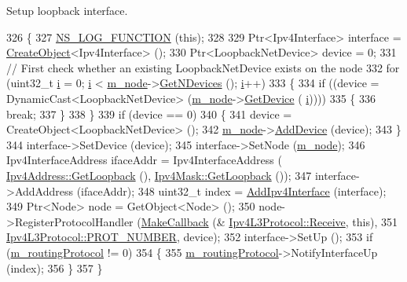 Setup loopback interface. 


\begin{DoxyCode}
326 \{
327   \hyperlink{log-macros-disabled_8h_a90b90d5bad1f39cb1b64923ea94c0761}{NS\_LOG\_FUNCTION} (\textcolor{keyword}{this});
328 
329   Ptr<Ipv4Interface> \textcolor{keyword}{interface }= \hyperlink{group__object_gad1d36559be10afa72c3656fd8598c1e2}{CreateObject}<Ipv4Interface> ();
330   Ptr<LoopbackNetDevice> device = 0;
331   \textcolor{comment}{// First check whether an existing LoopbackNetDevice exists on the node}
332   \textcolor{keywordflow}{for} (uint32\_t \hyperlink{bernuolliDistribution_8m_a6f6ccfcf58b31cb6412107d9d5281426}{i} = 0; \hyperlink{bernuolliDistribution_8m_a6f6ccfcf58b31cb6412107d9d5281426}{i} < \hyperlink{classns3_1_1Ipv4L3Protocol_ad2cc5076c247724f1e99b398edc1965a}{m\_node}->\hyperlink{classns3_1_1Node_a531554d2241ba4fa1cd74e3360be6bce}{GetNDevices} (); \hyperlink{bernuolliDistribution_8m_a6f6ccfcf58b31cb6412107d9d5281426}{i}++)
333     \{
334       \textcolor{keywordflow}{if} ((device = DynamicCast<LoopbackNetDevice> (\hyperlink{classns3_1_1Ipv4L3Protocol_ad2cc5076c247724f1e99b398edc1965a}{m\_node}->\hyperlink{classns3_1_1Node_a5918dfd24ef632efc9a83a5f6561c76e}{GetDevice} (
      \hyperlink{bernuolliDistribution_8m_a6f6ccfcf58b31cb6412107d9d5281426}{i}))))
335         \{
336           \textcolor{keywordflow}{break};
337         \}
338     \}
339   \textcolor{keywordflow}{if} (device == 0)
340     \{
341       device = CreateObject<LoopbackNetDevice> (); 
342       \hyperlink{classns3_1_1Ipv4L3Protocol_ad2cc5076c247724f1e99b398edc1965a}{m\_node}->\hyperlink{classns3_1_1Node_a42ff83ee1d5d1649c770d3f5b62375de}{AddDevice} (device);
343     \}
344   interface->SetDevice (device);
345   interface->SetNode (\hyperlink{classns3_1_1Ipv4L3Protocol_ad2cc5076c247724f1e99b398edc1965a}{m\_node});
346   Ipv4InterfaceAddress ifaceAddr = Ipv4InterfaceAddress (
      \hyperlink{classns3_1_1Ipv4Address_a583a93499e0d947439794d7bd0c6366d}{Ipv4Address::GetLoopback} (), \hyperlink{classns3_1_1Ipv4Mask_a7842be570f11b3ffcf3a50b0639bcf2d}{Ipv4Mask::GetLoopback} ());
347   interface->AddAddress (ifaceAddr);
348   uint32\_t index = \hyperlink{classns3_1_1Ipv4L3Protocol_afd3f97720c2d1af22f05038fcdb6e089}{AddIpv4Interface} (interface);
349   Ptr<Node> node = GetObject<Node> ();
350   node->RegisterProtocolHandler (\hyperlink{group__makecallbackmemptr_ga9376283685aa99d204048d6a4b7610a4}{MakeCallback} (&
      \hyperlink{classns3_1_1Ipv4L3Protocol_a2f27fb0a3f698ffb34a654323b063c94}{Ipv4L3Protocol::Receive}, \textcolor{keyword}{this}), 
351                                  \hyperlink{classns3_1_1Ipv4L3Protocol_a0146bc84815b7b73adb9c62cdafc9442}{Ipv4L3Protocol::PROT\_NUMBER}, device);
352   interface->SetUp ();
353   \textcolor{keywordflow}{if} (\hyperlink{classns3_1_1Ipv4L3Protocol_abc52052cbf9c4104be407221397c7a55}{m\_routingProtocol} != 0)
354     \{
355       \hyperlink{classns3_1_1Ipv4L3Protocol_abc52052cbf9c4104be407221397c7a55}{m\_routingProtocol}->NotifyInterfaceUp (index);
356     \}
357 \}
\end{DoxyCode}


